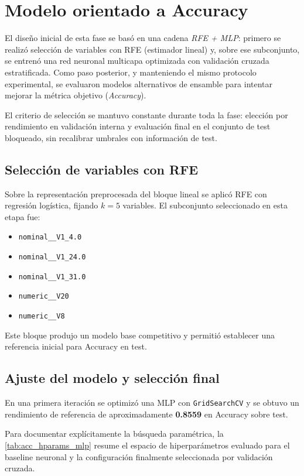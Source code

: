 \section{Modelo orientado a Accuracy}

El diseño inicial de esta fase se basó en una cadena \textit{RFE + MLP}: primero se realizó selección de variables con RFE (estimador lineal) y, sobre ese subconjunto, se entrenó una red neuronal multicapa optimizada con validación cruzada estratificada. Como paso posterior, y manteniendo el mismo protocolo experimental, se evaluaron modelos alternativos de ensamble para intentar mejorar la métrica objetivo (\textit{Accuracy}).

El criterio de selección se mantuvo constante durante toda la fase: elección por rendimiento en validación interna y evaluación final en el conjunto de test bloqueado, sin recalibrar umbrales con información de test.

\subsection{Selección de variables con RFE}

Sobre la representación preprocesada del bloque lineal se aplicó RFE con regresión logística, fijando $k=5$ variables. El subconjunto seleccionado en esta etapa fue:

\begin{itemize}
	\item \texttt{nominal\_\_V1\_4.0}
	\item \texttt{nominal\_\_V1\_24.0}
	\item \texttt{nominal\_\_V1\_31.0}
	\item \texttt{numeric\_\_V20}
	\item \texttt{numeric\_\_V8}
\end{itemize}

Este bloque produjo un modelo base competitivo y permitió establecer una referencia inicial para Accuracy en test.

\subsection{Ajuste del modelo y selección final}

En una primera iteración se optimizó una MLP con \texttt{GridSearchCV} y se obtuvo un rendimiento de referencia de aproximadamente \textbf{0.8559} en Accuracy sobre test.

Para documentar explícitamente la búsqueda paramétrica, la \cref{tab:acc_hparams_mlp} resume el espacio de hiperparámetros evaluado para el baseline neuronal y la configuración finalmente seleccionada por validación cruzada.

